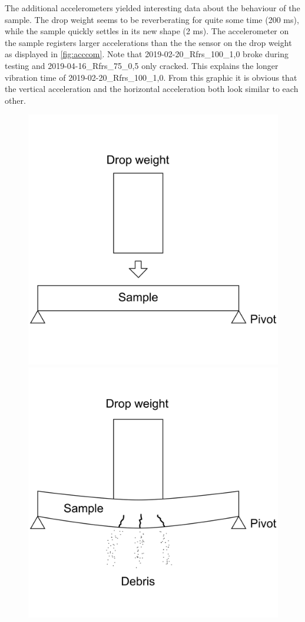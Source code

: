 The additional accelerometers yielded interesting data about the behaviour of the sample. The drop weight seems to be reverberating for quite some time (200 ms), while the sample quickly settles in its new shape (2 ms). The accelerometer on the sample registers larger accelerations than the the sensor on the drop weight as displayed in \autoref{fig:acccom}. Note that 2019-02-20\_Rfrs\_100\_1,0 broke during testing  and 2019-04-16\_Rfrs\_75\_0,5 only cracked. This explains the longer vibration time of 2019-02-20\_Rfrs\_100\_1,0. From this graphic it is obvious that the vertical acceleration and the horizontal acceleration both look similar to each other.

\begin{figure}
    \centering
    {\includegraphics[width = 0.45\linewidth]{pics/bounce_0.png}}
    {\includegraphics[width = 0.45\linewidth]{pics/bounce_1.png}}
    

\end{figure}
